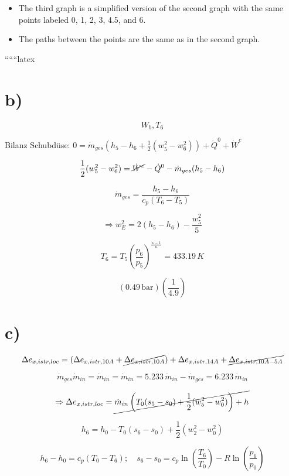 \begin{itemize}
    \item The third graph is a simplified version of the second graph with the same points labeled 0, 1, 2, 3, 4.5, and 6.
    \item The paths between the points are the same as in the second graph.
\end{itemize}

``````latex


\section*{b)}

\[ W_{b}, T_{6} \]

Bilanz Schubdüse: \( 0 = \dot{m}_{ges} (h_{5} - h_{6} + \frac{1}{2} (w_{5}^{2} - w_{6}^{2})) + \dot{Q}^{0} + \dot{W}^{c} \)

\[ \frac{1}{2} (w_{5}^{2} - w_{6}^{2}) = \cancel{\dot{W}^{c}} - \dot{Q}^{0} - \dot{m}_{ges} (h_{5} - h_{6}) \]

\[ \dot{m}_{ges} = \frac{h_{5} - h_{6}}{c_{p} (T_{6} - T_{5})} \]

\[ \Rightarrow w_{E}^{2} = 2 (h_{5} - h_{6}) - \frac{w_{5}^{2}}{5} \]

\[ T_{6} = T_{5} \left( \frac{p_{6}}{p_{5}} \right)^{\frac{\kappa - 1}{\kappa}} = 433.19 \, K \]

\[ \left( 0.49 \, \text{bar} \right) \left( \frac{1}{4.9} \right) \]

\section*{c)}

\[ \Delta e_{x,istr,loc} = (\Delta e_{x,istr,10A} + \cancel{\Delta e_{x,istr,10A}}) + \Delta e_{x,istr,14A} + \cancel{\Delta e_{x,istr,10A-5A}} \]

\[ \dot{m}_{ges} \dot{m}_{in} = \dot{m}_{in} = \dot{m}_{in} = 5.233 \, \dot{m}_{in} - \dot{m}_{ges} = 6.233 \, \dot{m}_{in} \]

\[ \Rightarrow \Delta e_{x,istr,loc} = \cancel{\dot{m}_{in} \left( T_{0} (s_{5} - s_{0}) + \frac{1}{2} (w_{5}^{2} - w_{0}^{2}) \right) + h} \]

\[ h_{6} = h_{0} - T_{0} (s_{6} - s_{0}) + \frac{1}{2} (w_{2}^{2} - w_{0}^{2}) \]

\[ h_{6} - h_{0} = c_{p} (T_{0} - T_{6}); \quad s_{6} - s_{0} = c_{p} \ln \left( \frac{T_{6}}{T_{0}} \right) - R \ln \left( \frac{p_{6}}{p_{0}} \right) \]


